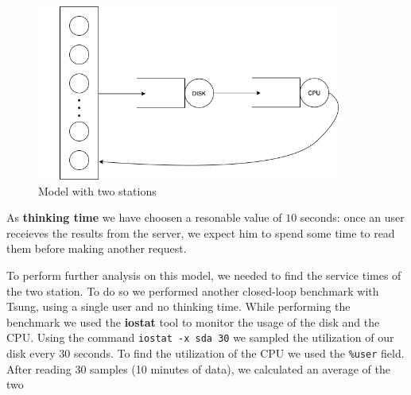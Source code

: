 \documentclass[11pt]{scrartcl} %
\begin{document}
\begin{figure}[h]
\includegraphics[width=10cm]{Images/img2.png}
\centering
\caption{Model with two stations}
\label{fig:img2}
\end{figure}

As \textbf{thinking time} we have choosen a resonable value of $10$ seconds: once an user receieves the results from the server, we expect him to spend some time to read them before making another request.

To perform further analysis on this model, we needed to find the service times of the two station. To do so we performed another closed-loop benchmark with Tsung, using a single user and no thinking time. While performing the benchmark we used the \textbf{iostat} tool to monitor the usage of the disk and the CPU. Using the command \texttt{iostat -x sda 30} we sampled the utilization of our disk every 30 seconds. To find the utilization of the CPU we used the \texttt{\%user} field. After reading 30 samples (10 minutes of data), we calculated an average of the two 
\end{document}
